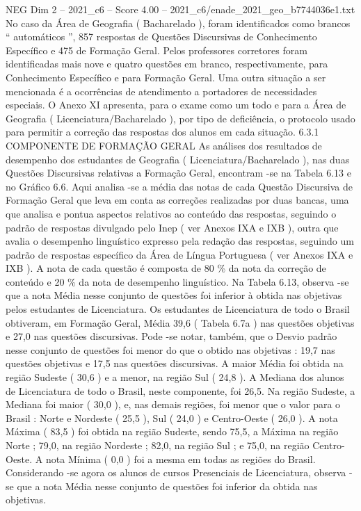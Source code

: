 \begin{textsample}{NEG Dim 2 – 2021\_c6 – Score 4.00 – 2021\_c6/enade\_2021\_geo\_b7744036e1.txt}
No caso da Área de Geografia ( Bacharelado ), foram identificados como brancos “ automáticos ”, 857 respostas de Questões Discursivas de Conhecimento Específico e 475 de Formação Geral.
Pelos professores corretores foram identificadas mais nove e quatro questões em branco, respectivamente, para Conhecimento Específico e para Formação Geral.
Uma outra situação a ser mencionada é a ocorrências de atendimento a portadores de necessidades especiais.
O Anexo XI apresenta, para o exame como um todo e para a Área de Geografia ( Licenciatura/Bacharelado ), por tipo de deficiência, o protocolo usado para permitir a correção das respostas dos alunos em cada situação. 6.3.1 COMPONENTE DE FORMAÇÃO GERAL As análises dos resultados de desempenho dos estudantes de Geografia ( Licenciatura/Bacharelado ), nas duas Questões Discursivas relativas a Formação Geral, encontram -se na Tabela 6.13 e no Gráfico 6.6.
Aqui analisa -se a média das notas de cada Questão Discursiva de Formação Geral que leva em conta as correções realizadas por duas bancas, uma que analisa e pontua aspectos relativos ao conteúdo das respostas, seguindo o padrão de respostas divulgado pelo Inep ( ver Anexos IXA e IXB ), outra que avalia o desempenho linguístico expresso pela redação das respostas, seguindo um padrão de respostas específico da Área de Língua Portuguesa ( ver Anexos IXA e IXB ).
A nota de cada questão é composta de 80 \% da nota da correção de conteúdo e 20 \% da nota de desempenho linguístico.
Na Tabela 6.13, observa -se que a nota Média nesse conjunto de questões foi inferior à obtida nas objetivas pelos estudantes de Licenciatura.
Os estudantes de Licenciatura de todo o Brasil obtiveram, em Formação Geral, Média 39,6 ( Tabela 6.7a ) nas questões objetivas e 27,0 nas questões discursivas.
Pode -se notar, também, que o Desvio padrão nesse conjunto de questões foi menor do que o obtido nas objetivas : 19,7 nas questões objetivas e 17,5 nas questões discursivas.
A maior Média foi obtida na região Sudeste ( 30,6 ) e a menor, na região Sul ( 24,8 ).
A Mediana dos alunos de Licenciatura de todo o Brasil, neste componente, foi 26,5.
Na região Sudeste, a Mediana foi maior ( 30,0 ), e, nas demais regiões, foi menor que o valor para o Brasil : Norte e Nordeste ( 25,5 ), Sul ( 24,0 ) e Centro-Oeste ( 26,0 ).
A nota Máxima ( 83,5 ) foi obtida na região Sudeste, sendo 75,5, a Máxima na região Norte ; 79,0, na região Nordeste ; 82,0, na região Sul ; e 75,0, na região Centro-Oeste.
A nota Mínima ( 0,0 ) foi a mesma em todas as regiões do Brasil.
Considerando -se agora os alunos de cursos Presenciais de Licenciatura, observa -se que a nota Média nesse conjunto de questões foi inferior da obtida nas objetivas.

\end{textsample}
